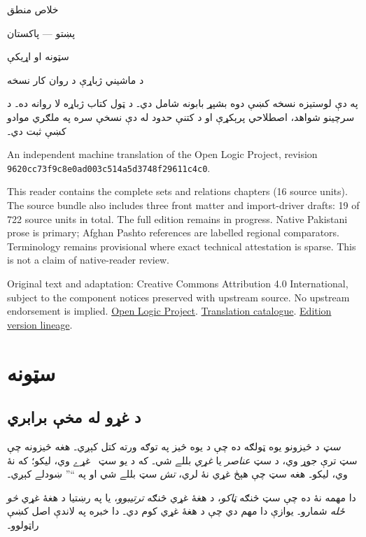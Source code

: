 \documentclass[12pt,a4paper,oneside]{report}
\newcommand{\olfileid}[3]{\gdef\pspart{#1}\gdef\pschapter{#2}\gdef\pssection{#3}}
\newcommand{\olchapter}[3]{\gdef\pspart{#1}\gdef\pschapter{#2}\gdef\pssection{}\chapter{#3}\label{#1:#2::chap}}
\newcommand{\olsection}[1]{\section{#1}\label{\pspart:\pschapter:\pssection:sec}}
\newenvironment{explain}{}{}
\begin{document}
\setRTL
\begin{titlepage}
\begin{center}
\vspace*{25mm}
{\Huge خلاص منطق}\par\bigskip
{\Large پښتو — پاکستان}\par\bigskip
{\LARGE سټونه او اړيکې}\par\bigskip
د ماشيني ژباړې د روان کار نسخه
\end{center}
\bigskip
په دې لوستيزه نسخه کښې دوه بشپړ بابونه شامل دي۔ د ټول کتاب ژباړه لا
روانه ده۔ د سرچينو شواهد، اصطلاحي پرېکړې او د کتنې حدود له دې نسخې
سره په ملګري موادو کښې ثبت دي۔
\begin{LTR}\latinfont\small
An independent machine translation of the Open Logic Project, revision\\
\texttt{9620cc73f9c8e0ad003c514a5d3748f29611c4c0}.\par
This reader contains the complete sets and relations chapters (16 source
units). The source bundle also includes three front matter and import-driver
drafts: 19 of 722 source units in total. The full edition remains in progress.
Native Pakistani prose is primary; Afghan Pashto references are labelled
regional comparators. Terminology remains provisional where exact technical
attestation is sparse. This is not a claim of native-reader review.

Original text and adaptation: Creative Commons Attribution 4.0 International,
subject to the component notices preserved with upstream source.
No upstream endorsement is implied.
\href{https://openlogicproject.org/}{Open Logic Project}.\quad
\href{https://github.com/KokunoYumeto/OpenLogic-translations}{Translation catalogue}.\quad
\href{https://doi.org/10.5281/zenodo.22307197}{Edition version lineage}.
\end{LTR}
\end{titlepage}
\tableofcontents
\clearpage

\olchapter{sfr}{set}{سټونه}


\olfileid{sfr}{set}{bas}
\olsection{د غړو له مخې برابري}

\emph{سټ} د څيزونو يوه ټولګه ده چې د يوه څيز په توګه ورته کتل کېږي۔ هغه څيزونه چې سټ ترې جوړ وي، د سټ \emph{عناصر} يا \emph{غړي} بللے شي۔ که  د يو سټ~ غړے وي،  ليکو؛ که نۀ وي،  ليکو۔ هغه سټ چې هېڅ غړي نۀ لري، \emph{تش} سټ بللے شي او په ``\LR{$\emptyset$}'' ښودلے کېږي۔

\begin{explain}
دا مهمه نۀ ده چې سټ څنګه \emph{ټاکو}، د هغۀ غړي څنګه \emph{ترتيبوو}، يا په رښتيا د هغۀ غړي \emph{څو ځله} شمارو۔ يوازې دا مهم دي چې د هغۀ غړي کوم دي۔ دا خبره په لاندې اصل کښې راټولوو۔
\end{explain}
\end{document}
